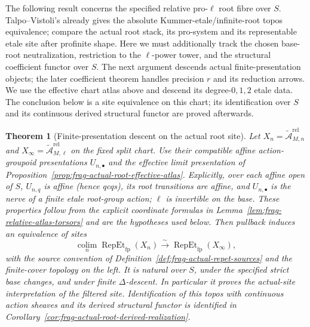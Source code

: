 \documentclass[11pt]{article}
\newtheorem{theorem}{Theorem}[section]
\theoremstyle{definition}
\theoremstyle{remark}
\begin{document}
The following result concerns the specified relative pro-$\ell$ root
fibre over $S$.  Talpo--Vistoli's
\cite[Theorem 6.22, arXiv v2 numbering]{TalpoVistoliInfiniteRoot}
already gives the absolute Kummer-etale/infinite-root topos equivalence;
\cite[\S\S5--6]{CarchediEtAlLogHomotopy} compare the actual root stack,
its pro-system and its representable etale site after profinite shape.
Here we must additionally track the chosen base-root neutralization,
restriction to the $\ell$-power tower, and the structural coefficient
functor over $S$.  The next argument descends actual finite-presentation
objects; the later coefficient theorem handles precision $r$ and its
reduction arrows.  We use the effective chart atlas above and
descend its degree-$0,1,2$ etale data.  The conclusion below is a
site equivalence on this chart; its identification over $S$ and its
continuous derived structural functor are proved afterwards.

\begin{theorem}[Finite-presentation descent on the actual root site]
\label{thm:frag-actual-root-fp-descent}
Let $X_n=\widetilde{\mathcal A}_{M,n}^{\mathrm{rel}}$ and
$X_\infty=\widetilde{\mathcal A}_{M,\ell}^{\mathrm{rel}}$ on the fixed
split chart.  Use their compatible affine action-groupoid presentations
$U_{n,\bullet}$ and the effective limit presentation of
Proposition~\ref{prop:frag-actual-root-effective-atlas}.  Explicitly,
over each affine open of $S$, $U_{n,q}$ is affine (hence qcqs),
its root transitions are affine,
and $U_{n,\bullet}$ is the nerve of a finite etale root-group action;
$\ell$ is invertible on the base.  These properties follow from the
explicit coordinate formulas in Lemma~\ref{lem:frag-relative-atlas-torsors}
and are the hypotheses used below.
Then pullback induces an equivalence of sites
\[
 \operatorname*{colim}_n\operatorname{RepEt}_{\mathrm{fp}}(X_n)
 \xrightarrow{\sim}\operatorname{RepEt}_{\mathrm{fp}}(X_\infty),
\]
with the source convention of Definition~\ref{def:frag-actual-repet-sources}
and the finite-cover topology on the left.  It is natural over $S$,
under the specified strict base changes, and under finite $\Delta$-descent.
In particular it proves the actual-site interpretation of the filtered
site.  Identification of this topos with continuous action sheaves and
its derived structural functor is identified in
Corollary~\ref{cor:frag-actual-root-derived-realization}.
\end{theorem}
\end{document}
